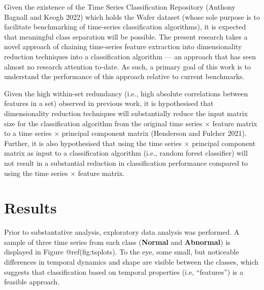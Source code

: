 \documentclass{article}
\begin{document}
Given the existence of the Time Series Classification Repository
(Anthony Bagnall and Keogh 2022) which holds the Wafer dataset (whose
sole purpose is to facilitate benchmarking of time-series classification
algorithms), it is expected that meaningful class separation will be
possible. The present research takes a novel approach of chaining
time-series feature extraction into dimensionality reduction techniques
into a classification algorithm --- an approach that has seen almost no
research attention to-date. As such, a primary goal of this work is to
understand the performance of this approach relative to current
benchmarks.

Given the high within-set redundancy (i.e., high absolute correlations
between features in a set) observed in previous work, it is hypothesised
that dimensionality reduction techniques will substantially reduce the
input matrix size for the classification algorithm from the original
time series \(\times\) feature matrix to a time series \(\times\)
principal component matrix (Henderson and Fulcher 2021). Further, it is
also hypothesised that using the time series \(\times\) principal
component matrix as input to a classification algorithm (i.e., random
forest classifier) will not result in a substantial reduction in
classification performance compared to using the time series \(\times\)
feature matrix.

\hypertarget{results}{%
\section{Results}\label{results}}

Prior to substantative analysis, exploratory data analysis was
performed. A sample of three time series from each class
(\textbf{Normal} and \textbf{Abnormal}) is displayed in Figure
@ref(fig:tsplots). To the eye, some small, but noticeable differences in
temporal dynamics and shape are visible between the classes, which
suggests that classification based on temporal properties (i.e,
``features'') is a feasible approach.
\end{document}
